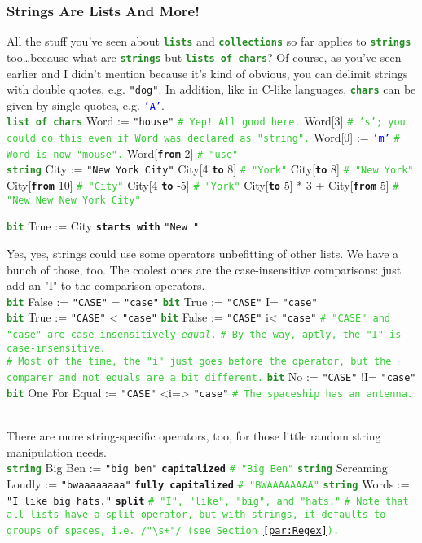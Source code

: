 \documentclass{article}
\newcommand{\sssecl}[1]{\subsubsection{#1}\label{sssec:#1}}
\newcommand{\codecomment}[1]{\texttt{\textcolor{LimeGreen}{#1}}}
\newcommand{\commentline}[1]{\codecomment{\# #1}}
\newcommand{\type}[1]{\texttt{\textcolor{ForestGreen}{\textbf{#1}}}}
\newcommand{\common}[1]{\texttt{\textcolor{Mulberry}{\textbf{#1}}}}
\newcommand{\codestring}[1]{\texttt{\textcolor{NavyBlue}{"#1"}}}
\newcommand{\codechar}[1]{\texttt{\textcolor{Blue}{#1}}}
\newenvironment{code}[0]
{\ttfamily{}				%
\setlength\parindent{0cm}	%
~\\}
{\setlength\parindent{1cm}
~\\}
\begin{document}
\sssecl{Strings Are Lists And More!}
\indent All the stuff you've seen about \type{lists} and \type{collections} so far applies to \type{strings} too\ldots because what are \type{strings} but \type{lists of chars}? Of course, as you've seen earlier and I didn't mention because it's kind of obvious, you can delimit strings with double quotes, e.g. \codestring{dog}. In addition, like in C-like languages, \type{chars} can be given by single quotes, e.g. \codechar{'A'}.
\begin{code}
\type{list of chars} Word := \codestring{house} \commentline{Yep! All good here.}
Word[3]	\commentline{'s'; you could do this even if Word was declared as "string".}
Word[0] := \codechar{'m'} \commentline{Word is now "mouse".}
Word[\common{from} 2] \commentline{"use"}\\

\type{string} City := \codestring{New York City}
City[4 \common{to} 8] \commentline{"York"}
City[\common{to} 8] \commentline{"New York"}
City[\common{from} 10] \commentline{"City"}
City[4 \common{to} -5] \commentline{"York"}
City[\common{to} 5] * 3 + City[\common{from} 5] \commentline{"New New New York City"}

\type{bit} True := City \common{starts with} \codestring{New }
\end{code}

\indent Yes, yes, strings could use some operators unbefitting of other lists. We have a bunch of those, too. The coolest ones are the case-insensitive comparisons: just add an "I" to the comparison operators. 
\begin{code}
\type{bit} False := \codestring{CASE} = \codestring{case}
\type{bit} True := \codestring{CASE} I= \codestring{case}\\

\type{bit} True := \codestring{CASE} < \codestring{case}
\type{bit} False := \codestring{CASE} i< \codestring{case} \commentline{"CASE" and "case" are case-insensitively \emph{equal}.}
\commentline{By the way, aptly, the "I" is case-insensitive.}\\

\commentline{Most of the time, the "i" just goes before the operator, but the comparer and not equals are a bit different.}
\type{bit} No := \codestring{CASE} !I= \codestring{case}
\type{bit} One For Equal := \codestring{CASE} <i=> \codestring{case} \commentline{The spaceship has an antenna.}
\end{code}

\indent There are more string-specific operators, too, for those little random string manipulation needs.
\begin{code}
\type{string} Big Ben := \codestring{big ben} \common{capitalized} \commentline{"Big Ben"}
\type{string} Screaming Loudly := \codestring{bwaaaaaaaa} \common{fully capitalized} \commentline{"BWAAAAAAAA"}
\type{string} Words := \codestring{I like big hats.} \common{split} \commentline{"I", "like", "big", and "hats."}
\commentline{Note that all lists have a split operator, but with strings, it defaults to groups of spaces, i.e. /"\textbackslash{}s+"/ (see Section \ref{par:Regex}).}
\end{code}
\end{document}

